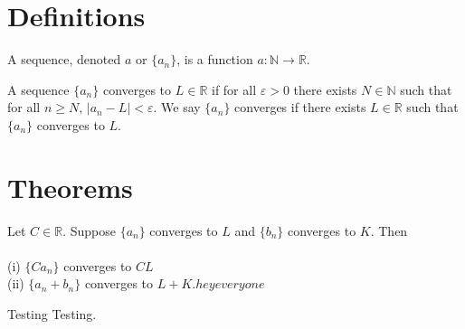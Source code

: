%

\section{Definitions}

\begin{definition}[Sequence]
  \label{def:sequence}
  A sequence, denoted $a$ or $\{a_n\}$, is a function $a : ℕ → \mathbb{R}$.
\end{definition}

\begin{definition}[Convergence]
  \label{def:convergence}
  \leanok

  A sequence $\{a_n\}$ converges to $L ∈ \mathbb{R}$ if for all $\varepsilon > 0$ there exists
  $N ∈ ℕ$ such that for all $n ≥ N$, $|a_n - L| < \varepsilon$.
  We say $\{a_n\}$ converges if there exists $L ∈ \mathbb{R}$ such that $\{a_n\}$ converges to $L$.

\end{definition}


\section{Theorems}


\begin{theorem}
  \label{thm:limit_laws}
  \leanok


  Let $C \in \mathbb{R}$. Suppose $\{a_n\}$ converges to $L$ and $\{b_n\}$ converges to $K$. Then \\ \\
  (i) $\{C a_n\}$ converges to $C L$ \\
  (ii) $\{a_n + b_n\}$ converges to $L + K. hey everyone$ 

\end{theorem}


\begin{theorem}[Test]
  \label{thm:test}
  \leanok

  Testing Testing.

\end{theorem}